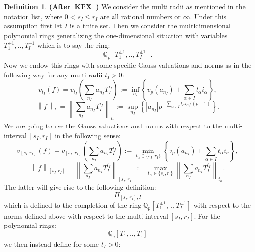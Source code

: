 \documentclass[12pt]{amsart}
\theoremstyle{definition}
\newtheorem{definition}[theorem]{Definition}
\numberwithin{equation}{section}
\begin{document}
\begin{definition} \mbox{\bf{(After KPX \cite[Notation 2.1.1]{KPX})}}
We consider the multi radii as mentioned in the notation list, where $0<s_I\leq r_I$ are all rational numbers or $\infty$. Under this assumption first let $I$ is a finite set. Then we consider the multidimensional polynomial rings generalizing the one-dimensional situation with variables $T_1^{\pm 1},..,T_I^{\pm 1}$ which is to say the ring:
\begin{displaymath}
\mathbb{Q}_p[T_1^{\pm 1},..,T_I^{\pm 1}].	
\end{displaymath}
Now we endow this rings with some specific Gauss valuations and norms as in the following way for any multi radii $t_I>0$:
\begin{displaymath}
v_{t_I}(f)=v_{t_I}(\sum_{n_I}a_{n_I}T_I^{i_I}):= \inf_{n_I}\left\{v_p(a_{n_I})+\sum_{\alpha\in I}t_\alpha i_\alpha\right\},
\end{displaymath}
\begin{displaymath}
\left\|f\right\|_{t_I}=\left\|\sum_{n_I}a_{n_I}T_I^{i_I}\right\|_{t_I}:= \sup_{n_I}\left\{|a_{n_I}|p^{-\sum_{\alpha\in I}t_\alpha i_\alpha/(p-1)}\right\}.
\end{displaymath}
We are going to use the Gauss valuations and norms with respect to the multi-interval $[s_I,r_I]$ in the following sense:
\begin{displaymath}
v_{[s_I,r_I]}(f)=v_{[s_I,r_I]}(\sum_{n_I}a_{n_I}T_I^{i_I}):= \min_{t_\alpha\in\{s_I,r_I\}}\left\{v_p(a_{n_I})+\sum_{\alpha\in I}t_\alpha i_\alpha\right\},
\end{displaymath}
\begin{displaymath}
\left\|f\right\|_{[s_I,r_I]}=\left\|\sum_{n_I}a_{n_I}T_I^{i_I}\right\|_{[s_I,r_I]}:= \max_{t_\alpha\in\{s_I,r_I\}}\left\|\sum_{n_I}a_{n_I}T_I^{i_I}\right\|_{t_\alpha}.	
\end{displaymath}
The latter will give rise to the following definition:
\begin{displaymath}
\Pi_{[s_I,r_I],I}	
\end{displaymath}
which is defined to the completion of the ring $\mathbb{Q}_p[T_1^{\pm 1},..,T_I^{\pm 1}]$ with respect to the norms defined above with respect to the multi-interval $[s_I,r_I]$. For the polynomial rings:
\begin{displaymath}
\mathbb{Q}_p[T_1,..,T_I]	
\end{displaymath}
we then instead define for some $t_I>0$:


\end{definition}
\end{document}
